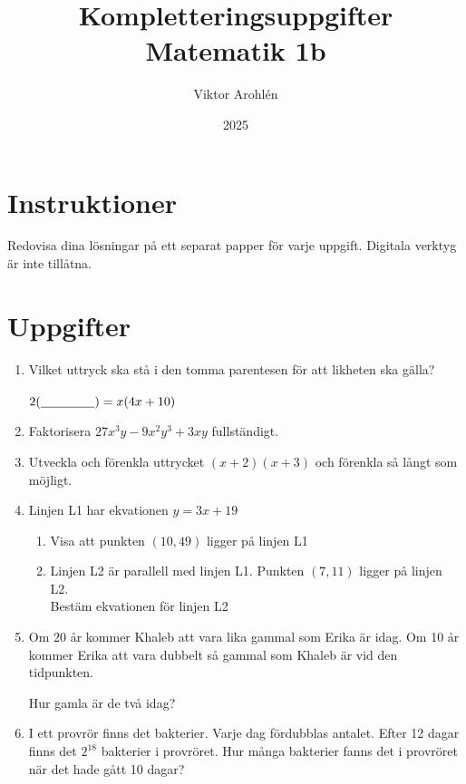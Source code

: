 \documentclass[12pt,a4paper]{article}
\title{Kompletteringsuppgifter Matematik 1b}
\author{Viktor Arohlén}
\date{2025}
\begin{document}
\maketitle

\section*{Instruktioner}
Redovisa dina lösningar på ett separat papper för varje uppgift. Digitala verktyg är inte tillåtna.

\section*{Uppgifter}

\begin{enumerate}[label=\textbf{\arabic*.}, itemsep=1cm]
    \item Vilket uttryck ska stå i den tomma parentesen för att likheten ska gälla? \\ \\
        $2(\underline{\hspace{1.5cm}}) = x (4x + 10)$
    
    \item Faktorisera $27x^3y - 9x^2y^3 + 3xy$ fullständigt.
    
    \item Utveckla och förenkla uttrycket $(x + 2)(x + 3)$ och förenkla så långt som möjligt.
    
    \item Linjen L1 har ekvationen $y = 3x + 19$
        \begin{enumerate}[label=\textbf{\alph*)}, itemsep=0.5cm]
            \item Visa att punkten $(10,49)$ ligger på linjen L1
            \item Linjen L2 är parallell med linjen L1. Punkten $(7,11)$ ligger på linjen L2. \\
            Bestäm ekvationen för linjen L2
        \end{enumerate}

    \item Om 20 år kommer Khaleb att vara lika gammal som Erika är idag. Om 10 år kommer Erika att vara dubbelt så gammal som Khaleb är vid den tidpunkten.

    Hur gamla är de två idag? 

    \item  I ett provrör finns det bakterier. Varje dag fördubblas antalet. Efter 12 dagar finns det
    $2^{18}$ bakterier i provröret.
    Hur många bakterier fanns det i provröret när det hade gått 10 dagar?

\end{enumerate}
\end{document}
